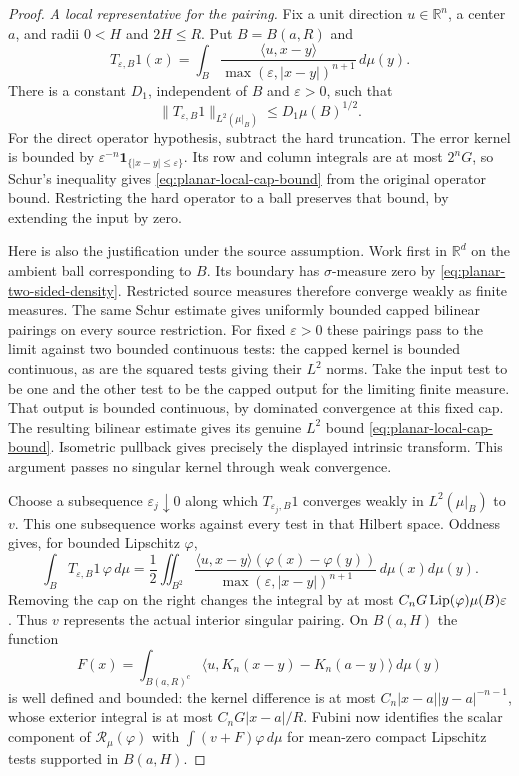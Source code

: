\begin{proof}
\emph{A local representative for the pairing.}
Fix a unit direction $u\in\mathbb R^n$, a center $a$, and radii
$0<H$ and $2H\le R$.  Put $B=B(a,R)$ and
\[
 T_{\varepsilon,B}1(x)=\int_B
 \frac{\langle u,x-y\rangle}{\max(\varepsilon,|x-y|)^{n+1}}\,d\mu(y).
\]
There is a constant $D_1$, independent of $B$ and $\varepsilon>0$, such
that
\begin{equation}\label{eq:planar-local-cap-bound}
 \|T_{\varepsilon,B}1\|_{L^2(\mu|_B)}
 \le D_1\mu(B)^{1/2}.
\end{equation}
For the direct operator hypothesis, subtract the hard truncation.
The error kernel is bounded by
$\varepsilon^{-n}\mathbf1_{\{|x-y|\le\varepsilon\}}$.
Its row and column integrals are at most $2^nG$, so Schur's inequality
gives \eqref{eq:planar-local-cap-bound} from the original operator bound.
Restricting the hard operator to a ball preserves that bound, by extending
the input by zero.

Here is also the justification under the source assumption.  Work first
in $\mathbb R^d$ on the ambient ball corresponding to $B$.  Its boundary
has $\sigma$-measure zero by \eqref{eq:planar-two-sided-density}.
Restricted source measures therefore converge weakly as finite measures.
The same Schur estimate gives uniformly bounded capped bilinear pairings
on every source restriction.  For fixed $\varepsilon>0$ these pairings
pass to the limit against two bounded continuous tests: the capped kernel
is bounded continuous, as are the squared tests giving their $L^2$
norms.  Take the input test to be one and the other test to be the capped
output for the limiting finite measure.  That output is bounded
continuous, by dominated convergence at this fixed cap.  The resulting
bilinear estimate gives its genuine $L^2$ bound
\eqref{eq:planar-local-cap-bound}.  Isometric pullback gives precisely the
displayed intrinsic transform.  This argument passes no singular kernel
through weak convergence.

Choose a subsequence $\varepsilon_j\downarrow0$ along which
$T_{\varepsilon_j,B}1$ converges weakly in $L^2(\mu|_B)$ to $v$.
This one subsequence works against every test in that Hilbert space.
Oddness gives, for bounded Lipschitz $\varphi$,
\[
 \int_B T_{\varepsilon,B}1\,\varphi\,d\mu
 =\frac12\iint_{B^2}
 \frac{\langle u,x-y\rangle(\varphi(x)-\varphi(y))}
      {\max(\varepsilon,|x-y|)^{n+1}}\,d\mu(x)d\mu(y).
\]
Removing the cap on the right changes the integral by at most
$C_nG\operatorname{Lip}(\varphi)\mu(B)\varepsilon$.  Thus $v$ represents the actual
interior singular pairing.  On $B(a,H)$ the function
\[
 F(x)=\int_{B(a,R)^c}
 \langle u,K_n(x-y)-K_n(a-y)\rangle\,d\mu(y)
\]
is well defined and bounded: the kernel difference is at most
$C_n|x-a||y-a|^{-n-1}$, whose exterior integral is at most
$C_nG|x-a|/R$.  Fubini now identifies the scalar component of
$\mathcal R_\mu(\varphi)$ with $\int(v+F)\varphi\,d\mu$ for mean-zero
compact Lipschitz tests supported in $B(a,H)$.


\end{proof}
